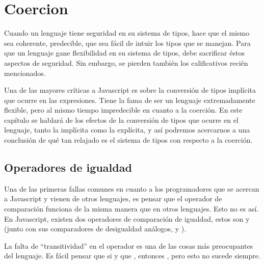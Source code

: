\chapter{Coercion} %

\label{ch:coercion} %

Cuando un lenguaje tiene seguridad en su sistema de tipos, hace que el mismo sea coherente, predecible, que sea fácil de intuir los tipos que se manejan. Para que un lenguaje gane flexibilidad en su sistema de tipos, debe sacrificar éstos aspectos de seguridad. Sin embargo, se pierden también los calificativos recién mencionados.

Una de las mayores críticas a Javascript es sobre la conversión de tipos implícita que ocurre en las expresiones. Tiene la fama de ser un lenguaje extremadamente flexible, pero al mismo tiempo impredecible en cuanto a la coerción. En este capítulo se hablará de los efectos de la conversión de tipos que ocurre en el lenguaje, tanto la implícita como la explícita, y así podremos acercarnos a una conclusión de qué tan relajado es el sistema de tipos con respecto a la coerción.

\section{Operadores de igualdad}
\label{sec:eqeqeq}

Una de las primeras fallas comunes en cuanto a los programadores que se acercan a Javascript y vienen de otros lenguajes, es pensar que el operador de comparación \code{==} funciona de la misma manera que en otros lenguajes. Esto no es así. En Javascript, existen dos operadores de comparación de igualdad, estos son \code{==} y \code{===} (junto con sus comparadores de desigualdad análogos, \code{!=} y \code{!==}).



La falta de "`transitividad"' en el operador \code{==} es una de las cosas más preocupantes del lenguaje. Es fácil pensar que si  y que , entonces , pero esto no sucede siempre.
 

